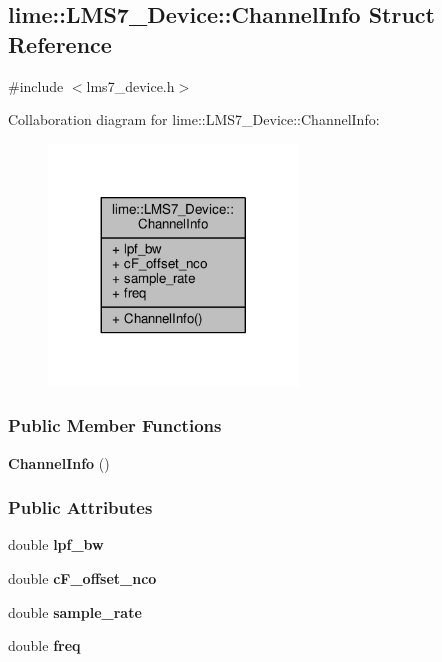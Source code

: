 \subsection{lime\+:\+:L\+M\+S7\+\_\+\+Device\+:\+:Channel\+Info Struct Reference}
\label{structlime_1_1LMS7__Device_1_1ChannelInfo}


{\ttfamily \#include $<$lms7\+\_\+device.\+h$>$}



Collaboration diagram for lime\+:\+:L\+M\+S7\+\_\+\+Device\+:\+:Channel\+Info\+:
\nopagebreak
\begin{figure}[H]
\begin{center}
\leavevmode
\includegraphics[width=188pt]{d6/dee/structlime_1_1LMS7__Device_1_1ChannelInfo__coll__graph}
\end{center}
\end{figure}
\subsubsection*{Public Member Functions}
\begin{DoxyCompactItemize}
\item 
{\bf Channel\+Info} ()
\end{DoxyCompactItemize}
\subsubsection*{Public Attributes}
\begin{DoxyCompactItemize}
\item 
double {\bf lpf\+\_\+bw}
\item 
double {\bf c\+F\+\_\+offset\+\_\+nco}
\item 
double {\bf sample\+\_\+rate}
\item 
double {\bf freq}
\end{DoxyCompactItemize}



